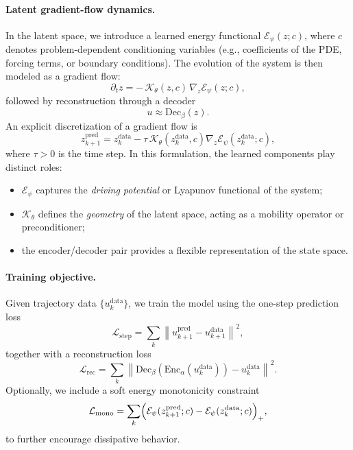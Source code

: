 \documentclass[11pt]{article}
\begin{document}
\paragraph{Latent gradient-flow dynamics.}
In the latent space, we introduce a learned energy functional $\mathcal E_\psi(z;c)$, where $c$ denotes problem-dependent conditioning variables (e.g., coefficients of the PDE, forcing terms, or boundary conditions). 
The evolution of the system is then modeled as a gradient flow:
\begin{equation}
\partial_t z
=
-\,\mathcal K_\theta(z,c)\,\nabla_z \mathcal E_\psi(z;c),
\label{eq:latent_gradient_flow}
\end{equation}
followed by reconstruction through a decoder
\begin{equation}
u \approx \mathrm{Dec}_\beta(z).
\end{equation}
An explicit discretization of a gradient flow is
\begin{equation}
\label{eq:latent_gf_diag}
z_{k+1}^{\mathrm{pred}}
=
z_k^{\mathrm{data}}
-
\tau \,\mathcal K_\theta(z_k^{\mathrm{data}},c)
\nabla_z \mathcal E_\psi(z_k^{\mathrm{data}};c),
\end{equation}
where $\tau>0$ is the time step. In this formulation, the learned components play distinct roles:
\begin{itemize}[itemsep=-2pt, topsep=2pt]
\item $\mathcal E_\psi$ captures the \emph{driving potential} or Lyapunov functional of the system;
\item $\mathcal K_\theta$ defines the \emph{geometry} of the latent space, acting as a mobility operator or preconditioner;
\item the encoder/decoder pair provides a flexible representation of the state space.
\end{itemize}

\paragraph{Training objective.}
Given trajectory data $\{u_k^{\mathrm{data}}\}$, we train the model using the one-step prediction loss
\begin{equation}
\label{eq:latent_gf_loss}
\mathcal L_{\mathrm{step}}
=
\sum_k
\left\|
u_{k+1}^{\mathrm{pred}}
-
u_{k+1}^{\mathrm{data}}
\right\|^2,
\end{equation}
together with a reconstruction loss
\[
\mathcal L_{\mathrm{rec}}
=
\sum_k
\left\|
\mathrm{Dec}_\beta(\mathrm{Enc}_\alpha(u_k^{\mathrm{data}}))
-
u_k^{\mathrm{data}}
\right\|^2.
\]
Optionally, we include a soft energy monotonicity constraint
\[
\mathcal L_{\mathrm{mono}}
=
\sum_k
\Bigl(
\mathcal E_\psi(z_{k+1}^{\mathrm{pred}};c)
-
\mathcal E_\psi(z_k^{\mathrm{data}};c)
\Bigr)_+,
\]
to further encourage dissipative behavior.
\end{document}
